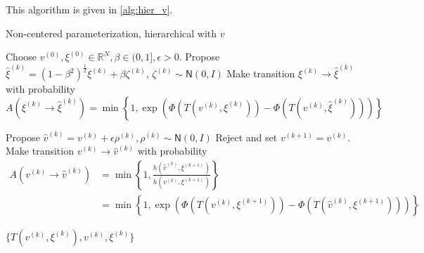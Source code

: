 \documentclass{siamart1116}
\begin{document}
        This algorithm is given in \cref{alg:hier_v}.
        \begin{algorithm}
            \caption{Non-centered parameterization, hierarchical with $v$}
            \label{alg:hier_v}
            \begin{algorithmic}[1]
            \State Choose $v^{(0)}, \xi^{(0)} \in \mathbb{R}^N, \beta \in (0, 1], \epsilon > 0$.
            \State Propose $\hat\xi^{(k)} = (1-\beta^2)^{\frac{1}{2}}\xi^{(k)} + \beta \zeta^{(k)}$, $\zeta^{(k)} \sim \mathsf{N}(0, I)$
            \State Make transition $\xi^{(k)} \to \hat\xi^{(k)}$ with probability
            \[ A(\xi^{(k)} \to \hat\xi^{(k)}) = \min\left\{1, \exp\left(\Phi(T(v^{(k)}, \xi^{(k)})) - \Phi(T(v^{(k)}, \hat \xi^{(k)}))\right) \right\}\]

            \State Propose $\hat v^{(k)} = v^{(k)} + \epsilon \rho^{(k)}, \rho^{(k)} \sim \mathsf{N}(0,I)$
                \State Reject and set $v^{(k+1)} = v^{(k)}$.
            \Else
            \State Make transition $v^{(k)} \to \hat v^{(k)}$ with probability
            \begin{align*}
             A(v^{(k)} \to \hat v^{(k)}) &= \min\left\{1, \frac{h(\hat v^{(k)}, \xi^{(k+1)})}{h(v^{(k)}, \xi^{(k+1)})}\right\} \\
             &= \min\left\{1, \exp\left(\Phi(T(v^{(k)}, \xi^{(k+1)}))-\Phi(T(\hat v^{(k)}, \xi^{(k+1)})) \right) \right\}
             \end{align*}
            \EndIf

            \EndFor
            \State \Return $\{ T(v^{(k)},\xi^{(k)}), v^{(k)}, \xi^{(k)} \}$
            \end{algorithmic}
        \end{algorithm}
\end{document}
